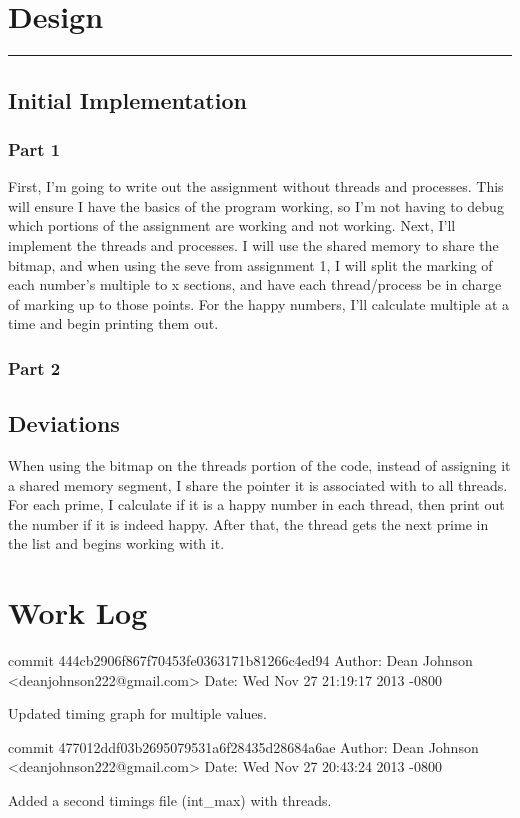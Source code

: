 \documentclass[fleqn,10pt,titlepage]{article}
\begin{document}
\section{Design}
\hrule
\subsection{Initial Implementation}
\subsubsection{Part 1}
First, I'm going to write out the assignment without threads and processes. This
will ensure I have the basics of the program working, so I'm not having to debug which
portions of the assignment are working and not working. Next, I'll implement the threads and
processes. I will use the shared memory to share the bitmap, and when using the seve from
assignment 1, I will split the marking of each number's multiple to x sections, and have 
each thread/process be in charge of marking up to those points. For the happy numbers, I'll
calculate multiple at a time and begin printing them out.
\subsubsection{Part 2}
\subsection{Deviations}
When using the bitmap on the threads portion of the code, instead of assigning it a shared
memory segment, I share the pointer it is associated with to all threads. For each prime, 
I calculate if it is a happy number in each thread, then print out the number if it is indeed
happy. After that, the thread gets the next prime in the list and begins working with it.
\clearpage

\section{Work Log}
commit 444cb2906f867f70453fe0363171b81266c4ed94
Author: Dean Johnson <deanjohnson222@gmail.com>
Date:   Wed Nov 27 21:19:17 2013 -0800

    Updated timing graph for multiple values.

commit 477012ddf03b2695079531a6f28435d28684a6ae
Author: Dean Johnson <deanjohnson222@gmail.com>
Date:   Wed Nov 27 20:43:24 2013 -0800

    Added a second timings file (int_max) with threads.
\end{document}
